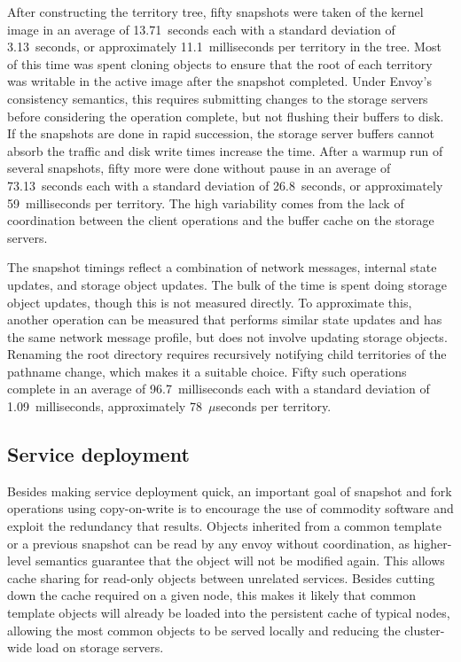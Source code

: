 After constructing the territory tree, fifty snapshots were taken of the kernel image in an average of 13.71~seconds each with a standard deviation of 3.13~seconds, or approximately 11.1~milliseconds per territory in the tree. Most of this time was spent cloning objects to ensure that the root of each territory was writable in the active image after the snapshot completed. Under Envoy's consistency semantics, this requires submitting changes to the storage servers before considering the operation complete, but not flushing their buffers to disk. If the snapshots are done in rapid succession, the storage server buffers cannot absorb the traffic and disk write times increase the time. After a warmup run of several snapshots, fifty more were done without pause in an average of 73.13~seconds each with a standard deviation of 26.8~seconds, or approximately 59~milliseconds per territory. The high variability comes from the lack of coordination between the client operations and the buffer cache on the storage servers.

The snapshot timings reflect a combination of network messages, internal state updates, and storage object updates. The bulk of the time is spent doing storage object updates, though this is not measured directly. To approximate this, another operation can be measured that performs similar state updates and has the same network message profile, but does not involve updating storage objects. Renaming the root directory requires recursively notifying child territories of the pathname change, which makes it a suitable choice. Fifty such operations complete in an average of 96.7~milliseconds each with a standard deviation of 1.09~milliseconds, approximately 78~$\mu$seconds per territory.

\subsection{Service deployment}

Besides making service deployment quick, an important goal of snapshot and fork operations using copy-on-write is to encourage the use of commodity software and exploit the redundancy that results. Objects inherited from a common template or a previous snapshot can be read by any envoy without coordination, as higher-level semantics guarantee that the object will not be modified again. This allows cache sharing for read-only objects between unrelated services. Besides cutting down the cache required on a given node, this makes it likely that common template objects will already be loaded into the persistent cache of typical nodes, allowing the most common objects to be served locally and reducing the cluster-wide load on storage servers.

